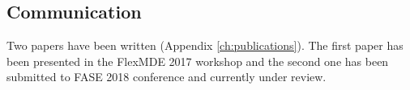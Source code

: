 \documentclass[12pt, a4paper]{report} \usepackage[titletoc]{appendix}
\begin{document}
\subsection{Communication}
\label{subsec:communication}
Two papers have been written (Appendix \ref{ch:publications}). The first paper \cite{yohannis2017turning} has been presented in the FlexMDE 2017 workshop and the second one \cite{yohannis2018algorithm} has been submitted to FASE 2018 conference and currently under review.

\end{document}
